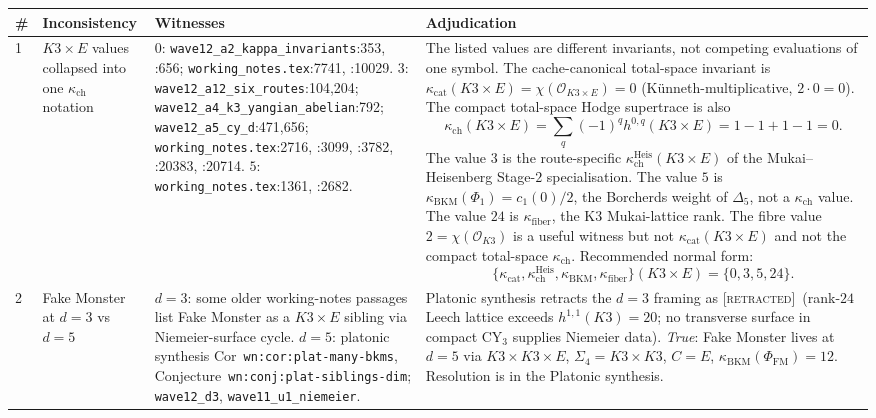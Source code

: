 \documentclass[11pt]{article}
\theoremstyle{definition}
\theoremstyle{remark}
\providecommand{\cO}{\mathcal{O}}
\providecommand{\kch}{\kappa_{\mathrm{ch}}}
\providecommand{\kcat}{\kappa_{\mathrm{cat}}}
\providecommand{\kBKM}{\kappa_{\mathrm{BKM}}}
\providecommand{\kfib}{\kappa_{\mathrm{fiber}}}
\providecommand{\ClaimStatusRetracted}{\textsc{[retracted]}}
\begin{document}
\begin{longtable}{@{}p{0.7cm}p{4.8cm}p{4.4cm}p{4.8cm}@{}}
\toprule
\# & \textbf{Inconsistency} & \textbf{Witnesses} & \textbf{Adjudication} \\
\midrule
\endfirsthead

1 & $K3\times E$ values collapsed into one $\kch$ notation
& $0$: \texttt{wave12\_a2\_kappa\_invariants}:353, :656;
\texttt{working\_notes.tex}:7741, :10029.
$3$: \texttt{wave12\_a12\_six\_routes}:104,204;
\texttt{wave12\_a4\_k3\_yangian\_abelian}:792;
\texttt{wave12\_a5\_cy\_d}:471,656;
\texttt{working\_notes.tex}:2716, :3099, :3782, :20383, :20714.
$5$: \texttt{working\_notes.tex}:1361, :2682.
& The listed values are different invariants, not competing evaluations
of one symbol. The cache-canonical total-space invariant is
$\kcat(K3\times E) = \chi(\cO_{K3\times E}) = 0$
(K\"unneth-multiplicative, $2\cdot 0 = 0$). The compact total-space
Hodge supertrace is also
\[
 \kch(K3\times E)=\sum_q(-1)^qh^{0,q}(K3\times E)
 =1-1+1-1=0.
\]
The value $3$ is the route-specific
$\kch^{\mathrm{Heis}}(K3\times E)$ of the Mukai--Heisenberg
Stage-$2$ specialisation. The value $5$ is
$\kBKM(\Phi_1)=c_1(0)/2$, the Borcherds weight of $\Delta_5$, not a
$\kch$ value. The value $24$ is $\kfib$, the K3 Mukai-lattice rank.
The fibre value $2=\chi(\cO_{K3})$ is a useful witness but not
$\kcat(K3\times E)$ and not the compact total-space $\kch$.
Recommended normal form:
\[
 \{\kcat,\kch^{\mathrm{Heis}},\kBKM,\kfib\}(K3\times E)
 = \{0,3,5,24\}.
\]
\\[0.3ex]

2 & Fake Monster at $d = 3$ vs $d = 5$
& $d=3$: some older working-notes passages list Fake Monster as a
$K3\times E$ sibling via Niemeier-surface cycle.
$d=5$: platonic synthesis
Cor~\texttt{wn:cor:plat-many-bkms},
Conjecture~\texttt{wn:conj:plat-siblings-dim};
\texttt{wave12\_d3}, \texttt{wave11\_u1\_niemeier}.
& Platonic synthesis retracts the $d=3$ framing as
\ClaimStatusRetracted\ (rank-$24$ Leech lattice exceeds $h^{1,1}(K3)
= 20$; no transverse surface in compact CY$_3$ supplies Niemeier data).
\emph{True}: Fake Monster lives at $d=5$ via $K3\times K3\times E$,
$\Sigma_4 = K3\times K3$, $C = E$, $\kBKM(\Phi_{\mathrm{FM}}) = 12$.
Resolution is in the Platonic synthesis.
\\[0.3ex]


\end{longtable}
\end{document}
